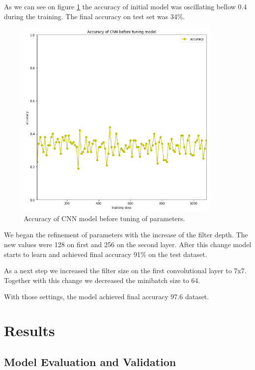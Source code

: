 \documentclass{article}
\begin{document}
As we can see on figure \ref{fig:InitialModelAccuracy} the accuracy of initial
model was oscillating bellow 0.4 during the training.  The final accuracy on
test set was 34\%.

\begin{figure}[!htp]
\centerline{\includegraphics[width=10cm]{img/initial_model_accuracy.png}}
\renewcommand{\figurename}{Figure}
\caption[Accuracy of CNN model before tuning of parameters.]{Accuracy of CNN model before tuning of parameters.}
\label{fig:InitialModelAccuracy}
\end{figure}

We began the refinement of parameters with the increase of the filter depth. The
new values were 128 on first and 256 on the second layer.  After this change
model starts to learn and achieved final accuracy 91\% on the test dataset.

As a next step we increased the filter size on the first convolutional layer to
7x7. Together with this change we decreased the minibatch size to 64.

With those settings, the model achieved final accuracy 97.6%
dataset.

\section{Results}\label{results}

\subsection{Model Evaluation and
Validation}\label{model-evaluation-and-validation}
\end{document}
